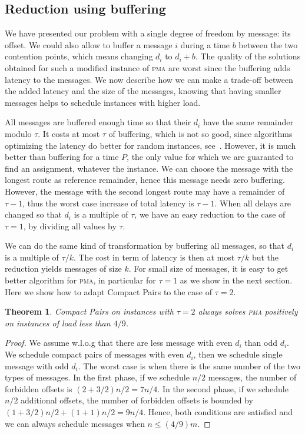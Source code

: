 \documentclass[10pt, conference, letterpaper]{IEEEtran}
\newtheorem{theorem}{Theorem}
\newcommand\pma{\textsc{pma}\xspace}
\begin{document}
\subsection{Reduction using buffering}

We have presented our problem with a single degree of freedom by message: its
offset. We could also allow to buffer a message $i$ during a time $b$ between the two contention points, which means changing $d_i$ to $d_i + b$. The quality of the solutions obtained for such a modified instance of \pma are worst since the buffering adds latency to the messages. We now describe how we can make a trade-off between the added latency and the size of the messages, knowing that having smaller messages helps to schedule instances with higher load.


All messages are buffered enough time so that their $d_i$ have the same
remainder modulo $\tau$. It costs at most $\tau$ of buffering, which is not
so good, since algorithms optimizing the latency do better for random instances, see~\cite{barth2018deterministic}. However, it is much better than buffering for a time $P$, the only value for which we are guaranted to find an assignment, whatever the instance. We can choose the message with the longest route as reference remainder, hence this message needs zero buffering. However, the message with the second longest route may have a remainder of $\tau -1$, thus the worst case increase of total latency is $\tau -1$. When all delays are changed so that $d_i$ is a multiple of $\tau$, we have an easy reduction to the case of $\tau = 1$, by dividing all values by $\tau$.

We can do the same kind of transformation by buffering all 
messages, so that $d_i$ is a multiple of $\tau / k$. The cost in term
of latency is then at most $\tau / k$ but the reduction yields messages of size $k$.
For small size of messages, it is easy to get better algorithm for \pma, in particular for $\tau = 1$ as we show in the next section. Here we show how to adapt Compact Pairs to the case of $\tau = 2$.

\begin{theorem}
Compact Pairs on instances with $\tau =2$ always solves \pma positively on instances of load less than $4/9$.
\end{theorem}
\begin{proof}
We assume w.l.o.g that there are less message with even $d_i$ than odd $d_i$.
We schedule compact pairs of messages with even $d_i$, then we schedule single message with odd $d_i$. The worst case is when there is the same number of the two types of messages. In the first phase, if we schedule
 $n/2$ messages, the number of forbidden offsets is $(2 + 3/2)n/2 = 7n/4$. In the second phase,
 if we schedule $n/2$ additional offsets, the number of forbidden offsets is bounded by 
$ (1 + 3/2) n/2  + (1 + 1)n/2 = 9n/4$.
Hence, both conditions are satisfied and we can always schedule messages when $n \leq (4/9)m$.
\end{proof}
\end{document}
